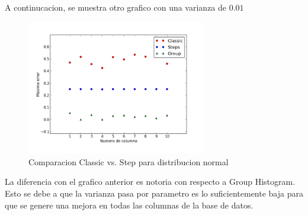\documentclass[10pt, a4paper,english,spanish,hidelinks]{article}
\begin{document}
A continucacion, se muestra otro grafico con una varianza de $0.01$
\newpage
\begin{figure}
  \centering
  \includegraphics[width=0.7\textwidth]{./imagenes/ejb2_normal_t_001.png}
  \caption{Comparacion Classic vs. Step para distribucion normal}
\end{figure}

La diferencia con el grafico anterior es notoria con respecto a Group Histogram. Esto se debe a que la varianza pasa por parametro es lo suficientemente baja para que se genere una mejora en todas las columnas de la base de datos. 
\end{document}
